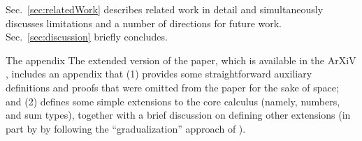 Sec.~\ref{sec:relatedWork} describes related work in detail and simultaneously discusses limitations and a number of directions for future work. Sec.~\ref{sec:discussion} briefly concludes. 

\ifarxiv
The appendix 
\else
The extended version of the paper, which is available in the ArXiV \cite{2018arXiv180500155O}, includes an appendix that 
\fi
(1) provides some straightforward auxiliary definitions and proofs that were omitted from the paper for the sake of space; and (2) defines some simple extensions to the core calculus (namely, numbers, and sum types), together with a brief discussion on defining other extensions (in part by by following the ``gradualization'' approach of \citet{DBLP:conf/popl/CiminiS16}). 
